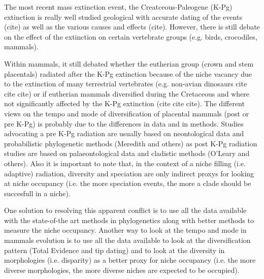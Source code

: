 \documentclass[12pt,letterpaper]{article}
\begin{document}


The most recent mass extinction event, the Creatceous-Paleogene (K-Pg) extinction is really well studied geological with accurate dating of the events (cite) as well as the various causes and effects (cite).
However, there is still debate on the effect of the extinction on certain vertebrate groups (e.g. birds, crocodiles, mammals).


Within mammals, it still debated whether the eutherian group (crown and stem placentals) radiated after the K-Pg extinction because of the niche vacancy due to the extinction of many terrestrial vertebrates (e.g. non-avian dinosaurs cite cite cite) or if eutherian mammals diversified during the Cretaceous and where not significantly affected by the K-Pg extinction (cite cite cite).
The different views on the tempo and mode of diversification of placental mammals (post or pre K-Pg) is probably due to the differences in data and in methods. Studies advocating a pre K-Pg radiation are usually based on neontological data and probabilistic phylogenetic methods (Meredith and others) as post K-Pg radiation studies are based on palaeontological data and cladistic methods (O'Leary and others). Also it is important to note that, in the context of a niche filling (i.e. adaptive) radiation, diversity and speciation are only indirect proxys for looking at niche occupancy (i.e. the more speciation events, the more a clade should be succesfull in a niche).

One solution to resolving this apparent conflict is to use all the data available with the state-of-the art methods in phylogenetics along with better methods to measure the niche occupancy.
Another way to look at the tempo and mode in mammals evolution is to use all the data available to look at the diversification pattern (Total Evidence and tip dating) and to look at the diversity in morphologies (i.e. disparity) as a better proxy for niche occupancy (i.e. the more diverse morphologies, the more diverse niches are expected to be occupied).
\end{document}
